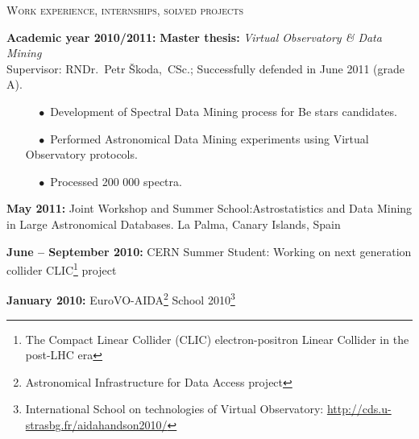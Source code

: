\begin{cv}
\begin{cvlist}{\large \textsc{Work experience, internships, solved projects}}
\item {\bf{Academic year 2010/2011:}} \textbf{Master thesis:}
  \textit{Virtual Observatory \& Data Mining}\\Supervisor: RNDr.~Petr Škoda,~CSc.; Successfully defended in June 2011 (grade A).
\vspace{-0.3cm}
\begin{itemize}
\item[$\quad \bullet$ \hspace{-1.5mm}] Development of Spectral Data
  Mining process for Be stars candidates.
\item[$\quad \bullet$ \hspace{-1.5mm}] Performed Astronomical Data
  Mining experiments using Virtual Observatory protocols.
\item[$\quad \bullet$ \hspace{-1.5mm}] Processed 200 000 spectra.



 \end{itemize}



\item {\bf{May 2011:}} Joint Workshop and Summer
  School:Astrostatistics and Data Mining in Large Astronomical
  Databases.  La Palma, Canary Islands, Spain

\item {\bf{June -- September 2010:}} CERN Summer Student: Working on
  next generation collider CLIC\footnote{The Compact Linear Collider
    (CLIC) electron-positron Linear Collider in the post-LHC era} project

\item {\bf{January 2010:}} EuroVO-AIDA\footnote{Astronomical
  Infrastructure for Data Access project} School
  2010\footnote{International School on technologies of Virtual
    Observatory:
    \href{http://cds.u-strasbg.fr/aidahandson2010/}{http://cds.u-strasbg.fr/aidahandson2010/}}



\end{cvlist}
\end{cv}
